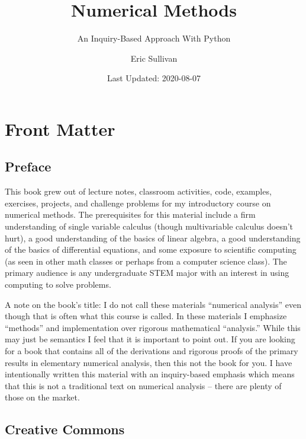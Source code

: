 \documentclass[
]{book}
\title{Numerical Methods}
\subtitle{An Inquiry-Based Approach With Python}
\author{Eric Sullivan}
\date{Last Updated: 2020-08-07}
\theoremstyle{definition}
\theoremstyle{definition}
\theoremstyle{definition}
\theoremstyle{remark}
\begin{document}
\maketitle

{
\hypersetup{linkcolor=}
\setcounter{tocdepth}{1}
\tableofcontents
}
\hypertarget{front-matter}{%
\chapter*{Front Matter}\label{front-matter}}

\hypertarget{preface}{%
\section*{Preface}\label{preface}}

This book grew out of lecture notes, classroom activities, code,
examples, exercises, projects, and challenge problems for my
introductory course on numerical methods. The prerequisites for this
material include a firm understanding of single variable calculus
(though multivariable calculus doesn't hurt), a good understanding of
the basics of linear algebra, a good understanding of the basics of
differential equations, and some exposure to scientific computing (as
seen in other math classes or perhaps from a computer science class).
The primary audience is any undergraduate STEM major with an interest in
using computing to solve problems.

A note on the book's title: I do not call these materials ``numerical
analysis'' even though that is often what this course is called. In these
materials I emphasize ``methods'' and implementation over rigorous
mathematical ``analysis.'' While this may just be semantics I feel that it
is important to point out. If you are looking for a book that contains
all of the derivations and rigorous proofs of the primary results in
elementary numerical analysis, then this not the book for you. I have
intentionally written this material with an inquiry-based emphasis which
means that this is not a traditional text on numerical analysis -- there
are plenty of those on the market.

\hypertarget{creative-commons}{%
\section*{Creative Commons}\label{creative-commons}}
\end{document}
